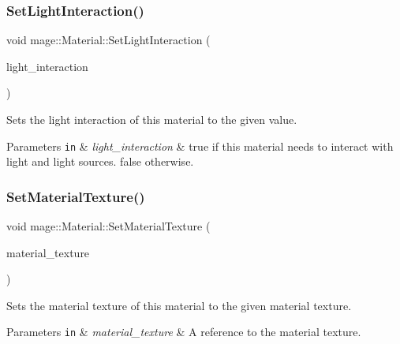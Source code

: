 \subsubsection{\texorpdfstring{Set\+Light\+Interaction()}{SetLightInteraction()}}
{\footnotesize\ttfamily void mage\+::\+Material\+::\+Set\+Light\+Interaction (\begin{DoxyParamCaption}\item[{bool}]{light\+\_\+interaction }\end{DoxyParamCaption})\hspace{0.3cm}{\ttfamily [noexcept]}}

Sets the light interaction of this material to the given value.


\begin{DoxyParams}[1]{Parameters}
\mbox{\tt in}  & {\em light\+\_\+interaction} & {\ttfamily true} if this material needs to interact with light and light sources. {\ttfamily false} otherwise. \\
\hline
\end{DoxyParams}
\hypertarget{classmage_1_1_material_a8f88eda4c45268bf6a30878948055ff5}{}\label{classmage_1_1_material_a8f88eda4c45268bf6a30878948055ff5} 
\subsubsection{\texorpdfstring{Set\+Material\+Texture()}{SetMaterialTexture()}}
{\footnotesize\ttfamily void mage\+::\+Material\+::\+Set\+Material\+Texture (\begin{DoxyParamCaption}\item[{const \hyperlink{namespacemage_a1e01ae66713838a7a67d30e44c67703e}{Shared\+Ptr}$<$ const \hyperlink{classmage_1_1_texture}{Texture} $>$ \&}]{material\+\_\+texture }\end{DoxyParamCaption})}

Sets the material texture of this material to the given material texture.


\begin{DoxyParams}[1]{Parameters}
\mbox{\tt in}  & {\em material\+\_\+texture} & A reference to the material texture. \\
\hline
\end{DoxyParams}
\hypertarget{classmage_1_1_material_a70dde310b2108e9ad3041df13db0bdc0}{}\label{classmage_1_1_material_a70dde310b2108e9ad3041df13db0bdc0} 
